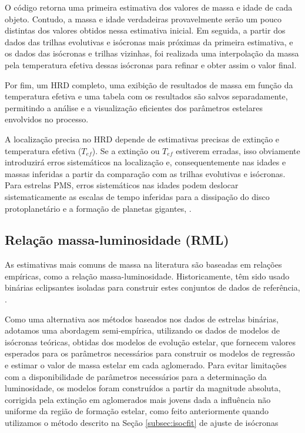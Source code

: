        O código retorna uma primeira estimativa dos valores de massa e idade de cada objeto. Contudo, a massa e idade verdadeiras provavelmente serão um pouco distintas dos valores obtidos nessa estimativa inicial. Em seguida, a partir dos dados das trilhas evolutivas e isócronas mais próximas da primeira estimativa, e os dados das isócronas e trilhas vizinhas, foi realizada uma interpolação da massa pela temperatura efetiva dessas isócronas para refinar e obter assim o valor final. 
       
       Por fim, um HRD completo, uma exibição de resultados de massa em função da temperatura efetiva e uma tabela com os resultados são salvos separadamente, permitindo a análise e a visualização eficientes dos parâmetros estelares envolvidos no processo.

        A localização precisa no HRD depende de estimativas precisas de extinção e temperatura efetiva (\(T_{ef}\)). Se a extinção ou \(T_{ef}\) estiverem erradas, isso obviamente introduzirá erros sistemáticos na localização e, consequentemente nas idades e massas inferidas a partir da comparação com as trilhas evolutivas e isócronas. Para estrelas PMS, erros sistemáticos nas idades podem deslocar sistematicamente as escalas de tempo inferidas para a dissipação do disco protoplanetário e a formação de planetas gigantes, \cite{Herczeg2015}.
        
    \subsection{Relação massa-luminosidade (RML)}\label{subsec:rml}
        As estimativas mais comuns de massa na literatura são baseadas em relações empíricas, como a relação massa-luminosidade. Historicamente, têm sido usado binárias eclipsantes isoladas para construir estes conjuntos de dados de referência,  \cite{serenelli2021weighing}.
        
        Como uma alternativa aos métodos baseados nos dados de estrelas binárias, adotamos uma abordagem semi-empírica, utilizando os dados de modelos de isócronas teóricas, obtidas dos modelos de evolução estelar, que fornecem valores esperados para os parâmetros necessários para construir os modelos de regressão e estimar o valor de massa estelar em cada aglomerado. 
        Para evitar limitações com a disponibilidade de parâmetros necessários para a determinação da luminosidade, os modelos foram construídos a partir da magnitude absoluta, corrigida pela extinção em aglomerados mais jovens dada a influência não uniforme da região de formação estelar, como feito anteriormente quando utilizamos o método descrito na Seção \ref{subsec:isocfit} de ajuste de isócronas
        
